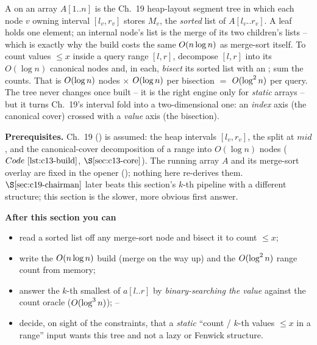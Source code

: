 \begin{topicintro}
A  on an array \(A[1..n]\) is the Ch.~19 heap-layout segment tree in which each node \(v\) owning interval \([l_v,r_v]\) stores \(M_v\), the \emph{sorted} list of \(A[l_v..r_v]\).  A leaf holds one element; an internal node's list is the merge of its two children's lists -- which is exactly why the build costs the same \(O(n\log n)\) as merge-sort itself.  To count values \(\le x\) inside a query range \([l,r]\), decompose \([l,r]\) into its \(O(\log n)\) canonical nodes and, in each, \emph{bisect} its sorted list with an ; sum the counts.  That is \(O(\log n)\) nodes \(\times\) \(O(\log n)\) per bisection \(=\) \(O(\log^2 n)\) per query.  The tree never changes once built -- it is the right engine only for \emph{static} arrays -- but it turns Ch.~19's interval fold into a two-dimensional one: an \emph{index} axis (the canonical cover) crossed with a \emph{value} axis (the bisection).

\textbf{Prerequisites.} Ch.~19 () is assumed: the heap intervals \([l_v,r_v]\), the split at \(\mathit{mid}\), and the canonical-cover decomposition of a range into \(O(\log n)\) nodes (\(\coderef{c13-build}\), \(\secref{c13-core}\)).  The running array \(A\) and its merge-sort overlay are fixed in the opener (); nothing here re-derives them.  \(\secref{c19-chairman}\) later beats this section's \(k\)-th pipeline with a different structure; this section is the slower, more obvious first answer.

\textbf{After this section you can}
\begin{itemize}[nosep]
  \item read a sorted list off any merge-sort node and bisect it to count \(\le x\); \hfill{}
  \item write the \(O(n\log n)\) build (merge on the way up) and the \(O(\log^2 n)\) range count from memory; \hfill{}
  \item answer the \(k\)-th smallest of \(a[l..r]\) by \emph{binary-searching the value} against the count oracle (\(O(\log^3 n)\)); \hfill{}--
  \item decide, on sight of the constraints, that a \emph{static} ``count / \(k\)-th values \(\le x\) in a range'' input wants this tree and not a lazy or Fenwick structure. \hfill{}
\end{itemize}
\end{topicintro}

